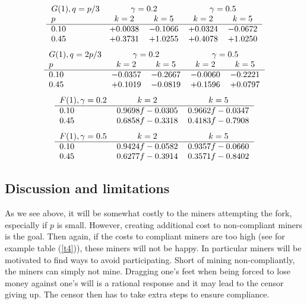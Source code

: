 \documentclass{article}%
\begin{document}
\[
\begin{tabular}[c]{lcccc}
$G(1),q=p/3$ & \multicolumn{2}{c}{$\gamma=0.2$} & \multicolumn{2}{c}{$\gamma=0.5$}\\
$p$ & $k=2$ & $k=5$ & $k=2$ & $k=5$\\ \hline
$0.10$ & $+0.0038$ & $-0.1066$ & $+0.0324$ & $-0.0672$\\
$0.45$ & $+0.3731$ & $+1.0255$ & $+0.4078$ & $+1.0250$\\
\end{tabular}
\]
\[
\begin{tabular}[c]{lcccc}
$G(1),q=2p/3$ & \multicolumn{2}{c}{$\gamma=0.2$} & \multicolumn{2}{c}{$\gamma=0.5$}\\
$p$ & $k=2$ & $k=5$ & $k=2$ & $k=5$\\ \hline
$0.10$ & $-0.0357$ & $-0.2667$ & $-0.0060$ & $-0.2221$\\
$0.45$ & $+0.1019$ & $-0.0819$ & $+0.1596$ & $+0.0797$\\
\end{tabular}
\]
\[
\begin{tabular}[c]{lcc}
$F(1),\gamma=0.2$ & $k=2$ & $k=5$\\ \hline
$0.10$ & $0.9698f-0.0305$ & $0.9662f-0.0347$\\
$0.45$ & $0.6858f-0.3318$ & $0.4183f-0.7908$\\
\end{tabular}
\]
\[
\begin{tabular}[c]{lcc}
$F(1),\gamma=0.5$ & $k=2$ & $k=5$\\ \hline
$0.10$ & $0.9424f-0.0582$ & $0.9357f-0.0660$\\
$0.45$ & $0.6277f-0.3914$ & $0.3571f-0.8402$\\
\end{tabular}
\]


\subsection{Discussion and limitations}

As we see above, it will be somewhat costly to the miners attempting the fork,
especially if $p$ is small.  However, creating additional cost to
non-compliant miners is the goal. Then again, if the costs to compliant miners are too
high (see for example table (\ref{t4})), these miners will not be happy.  In
particular miners will be motivated to find ways to avoid participating.
 Short of mining non-compliantly, the miners can simply not mine.  Dragging
one's feet when being forced to lose money against one's will is a rational
response and it may lead to the censor giving up.  The censor then has to
take extra steps to ensure compliance.
\end{document}
